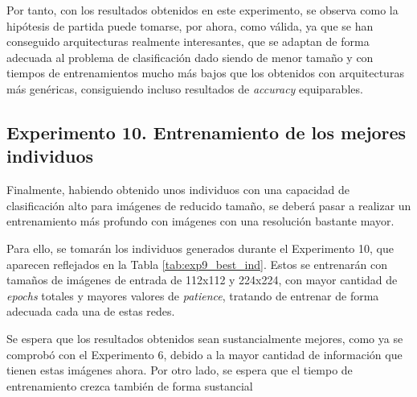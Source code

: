 Por tanto, con los resultados obtenidos en este experimento, se observa como la hipótesis de partida puede tomarse, por ahora, como válida, ya que se han conseguido arquitecturas realmente interesantes, que se adaptan de forma adecuada al problema de clasificación dado siendo de menor tamaño y con tiempos de entrenamientos mucho más bajos que los obtenidos con arquitecturas más genéricas, consiguiendo incluso resultados de \textit{accuracy} equiparables.

\subsection{Experimento 10. Entrenamiento de los mejores individuos}

Finalmente, habiendo obtenido unos individuos con una capacidad de clasificación alto para imágenes de reducido tamaño, se deberá pasar a realizar un entrenamiento más profundo con imágenes con una resolución bastante mayor.

Para ello, se tomarán los individuos generados durante el Experimento 10, que aparecen reflejados en la Tabla \ref{tab:exp9_best_ind}. Estos se entrenarán con tamaños de imágenes de entrada de 112x112 y 224x224, con mayor cantidad de \textit{epochs} totales y mayores valores de \textit{patience}, tratando de entrenar de forma adecuada cada una de estas redes.

Se espera que los resultados obtenidos sean sustancialmente mejores, como ya se comprobó con el Experimento 6, debido a la mayor cantidad de información que tienen estas imágenes ahora. Por otro lado, se espera que el tiempo de entrenamiento crezca también de forma sustancial

